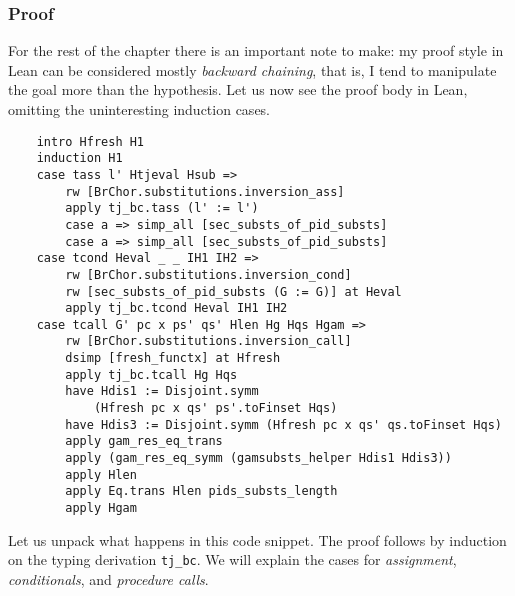 \documentclass[12pt,a4paper,twoside]{book}
\begin{document}
\subsubsection{Proof}
For the rest of the chapter there is an important note to make: my proof style in Lean can be considered mostly \emph{backward chaining}\cite{al2015comparison}, that is, I tend to manipulate the goal more than the hypothesis.
Let us now see the proof body in Lean, omitting the uninteresting induction cases.
\begin{samepage}
\begin{verbatim}
    intro Hfresh H1
    induction H1
    case tass l' Htjeval Hsub =>
        rw [BrChor.substitutions.inversion_ass]
        apply tj_bc.tass (l' := l')
        case a => simp_all [sec_substs_of_pid_substs]
        case a => simp_all [sec_substs_of_pid_substs]
    case tcond Heval _ _ IH1 IH2 =>
        rw [BrChor.substitutions.inversion_cond]
        rw [sec_substs_of_pid_substs (G := G)] at Heval
        apply tj_bc.tcond Heval IH1 IH2
    case tcall G' pc x ps' qs' Hlen Hg Hqs Hgam =>
        rw [BrChor.substitutions.inversion_call]
        dsimp [fresh_functx] at Hfresh
        apply tj_bc.tcall Hg Hqs
        have Hdis1 := Disjoint.symm
            (Hfresh pc x qs' ps'.toFinset Hqs)
        have Hdis3 := Disjoint.symm (Hfresh pc x qs' qs.toFinset Hqs)
        apply gam_res_eq_trans
        apply (gam_res_eq_symm (gamsubsts_helper Hdis1 Hdis3))
        apply Hlen
        apply Eq.trans Hlen pids_substs_length
        apply Hgam
\end{verbatim}
\end{samepage}
Let us unpack what happens in this code snippet. The proof follows by induction on the typing derivation \texttt{tj\_bc}. We will explain the cases for \emph{assignment}, \emph{conditionals}, and \emph{procedure calls}.
\end{document}

